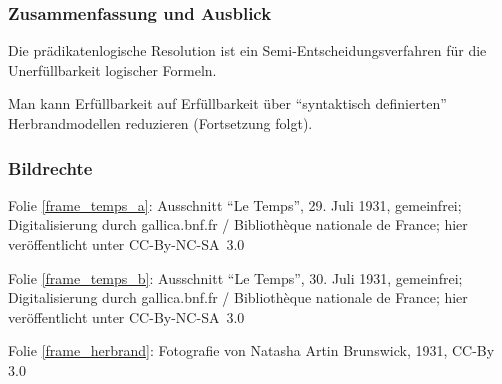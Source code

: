 \documentclass[aspectratio=1610,onlymath]{beamer}
\begin{document}
\begin{frame}\frametitle{Zusammenfassung und Ausblick}

Die prädikatenlogische Resolution ist ein Semi-Entscheidungsverfahren für die Unerfüllbarkeit logischer Formeln.\bigskip

Man kann Erfüllbarkeit auf Erfüllbarkeit über "`syntaktisch definierten"' Herbrandmodellen reduzieren
(Fortsetzung folgt).
% 

\bigskip


\end{frame}


\begin{frame}[t]\frametitle{Bildrechte}

Folie \ref{frame_temps_a}: Ausschnitt ``Le Temps'', 29. Juli 1931, gemeinfrei; Digitalisierung durch gallica.bnf.fr / Bibliothèque nationale de France; hier veröffentlicht unter CC-By-NC-SA~3.0
\medskip

Folie \ref{frame_temps_b}: Ausschnitt ``Le Temps'', 30. Juli 1931, gemeinfrei; Digitalisierung durch gallica.bnf.fr / Bibliothèque nationale de France; hier veröffentlicht unter CC-By-NC-SA~3.0
\medskip

Folie \ref{frame_herbrand}: Fotografie von Natasha Artin Brunswick, 1931, CC-By 3.0

\end{frame}
\end{document}
